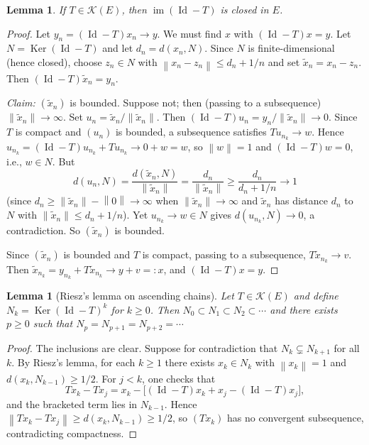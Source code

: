 \documentclass[a4paper,12pt]{book}
\DeclareMathOperator{\im}{im}
\DeclareMathOperator{\Id}{Id}
\DeclareMathOperator{\Ker}{Ker}
\newcommand{\norm}[1]{\left\| #1 \right\|}
\theoremstyle{definition}
\theoremstyle{plain}
\newtheorem{lemma}[definition]{Lemma}
\theoremstyle{remark}
\begin{document}
\begin{lemma}\label{lem:range-closed}
If $T \in \mathcal{K}(E)$, then $\im(\Id - T)$ is closed in $E$.
\end{lemma}

\begin{proof}
Let $y_n = (\Id - T)x_n \to y$. We must find $x$ with $(\Id - T)x = y$.
Let $N = \Ker(\Id - T)$ and let $d_n = d(x_n, N)$. Since $N$ is finite-dimensional
(hence closed), choose $z_n \in N$ with $\norm{x_n - z_n} \le d_n + 1/n$ and set
$\tilde{x}_n = x_n - z_n$. Then $(\Id - T)\tilde{x}_n = y_n$.

\emph{Claim:} $(\tilde{x}_n)$ is bounded. Suppose not; then (passing to a
subsequence) $\norm{\tilde{x}_n} \to \infty$. Set
$u_n = \tilde{x}_n / \norm{\tilde{x}_n}$. Then
$(\Id - T)u_n = y_n / \norm{\tilde{x}_n} \to 0$. Since $T$ is compact and
$(u_n)$ is bounded, a subsequence satisfies $Tu_{n_k} \to w$. Hence
$u_{n_k} = (\Id - T)u_{n_k} + Tu_{n_k} \to 0 + w = w$, so $\norm{w} = 1$ and
$(\Id - T)w = 0$, i.e., $w \in N$. But
\[
  d(u_n, N) = \frac{d(\tilde{x}_n, N)}{\norm{\tilde{x}_n}}
  = \frac{d_n}{\norm{\tilde{x}_n}}
  \ge \frac{d_n}{d_n + 1/n} \to 1
\]
(since $d_n \ge \norm{\tilde{x}_n} - \norm{0} \to \infty$ when
$\norm{\tilde{x}_n} \to \infty$ and $\tilde{x}_n$ has distance $d_n$ to $N$
with $\norm{\tilde{x}_n} \le d_n + 1/n$). Yet $u_{n_k} \to w \in N$ gives
$d(u_{n_k}, N) \to 0$, a contradiction. So $(\tilde{x}_n)$ is bounded.

Since $(\tilde{x}_n)$ is bounded and $T$ is compact, passing to a subsequence,
$T\tilde{x}_{n_k} \to v$. Then
$\tilde{x}_{n_k} = y_{n_k} + T\tilde{x}_{n_k} \to y + v =: x$, and
$(\Id - T)x = y$.
\end{proof}

\begin{lemma}[Riesz's lemma on ascending chains]\label{lem:ascending-chains}
Let $T \in \mathcal{K}(E)$ and define $N_k = \Ker(\Id - T)^k$ for $k \ge 0$.
Then $N_0 \subset N_1 \subset N_2 \subset \cdots$ and there exists $p \ge 0$
such that $N_p = N_{p+1} = N_{p+2} = \cdots$
\end{lemma}

\begin{proof}
The inclusions are clear. Suppose for contradiction that $N_k \subsetneq N_{k+1}$
for all $k$. By Riesz's lemma, for each $k \ge 1$ there
exists $x_k \in N_k$ with $\norm{x_k} = 1$ and $d(x_k, N_{k-1}) \ge 1/2$.
For $j < k$, one checks that
\[
  Tx_k - Tx_j = x_k - \bigl[(\Id - T)x_k + x_j - (\Id - T)x_j\bigr],
\]
and the bracketed term lies in $N_{k-1}$. Hence
$\norm{Tx_k - Tx_j} \ge d(x_k, N_{k-1}) \ge 1/2$, so $(Tx_k)$ has no convergent
subsequence, contradicting compactness.
\end{proof}
\end{document}
